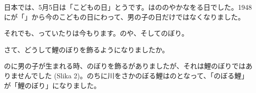 
\author{autor}

	
	\begin{bunshou}
		\hspace{15pt}日本では、5月5日は「こどもの日」とう\hspace{5pt}です。は\hspace{10pt}ののやかなを\hspace{10pt}る日でした。\hspace{5pt}1948にが「」から今のこどもの日にわって、男の子の日だけではなくなりました。
		
		それでも、\hspace{10pt}っていたりは今もります。\hspace{5pt}の\hspace{10pt}や\hspace{10pt}、そしてのぼり。
	\end{bunshou}

	\fukudai{teži dio}
	\begin{bunshou}
		さて、どうして鯉のぼりを飾るようになりましたか。
		
		のに男の子が生まれる時、のぼりを飾るがありましたが、それは鯉のぼりではありませんでした (Slika 2)。のちに川をさかのぼる鯉はの\hspace{10pt}となって、「のぼる鯉」が「鯉のぼり」になりました。
	\end{bunshou}

